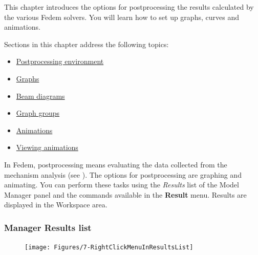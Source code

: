 %
%

%
%


This chapter introduces the options for postprocessing the results calculated by
the various Fedem solvers.
You will learn how to set up graphs, curves and animations.

Sections in this chapter address the following topics:

\begin{itemize}
\item
  \protect\hyperlink{postprocessing-environment}
                    {Postprocessing environment}
\item
  \protect\hyperlink{graphs}
                    {Graphs}
\item
  \protect\hyperlink{beam-diagrams}
                    {Beam diagrams}
\item
  \protect\hyperlink{graph-groups}
                    {Graph groups}
\item
  \protect\hyperlink{animations}
                    {Animations}
\item
  \protect\hyperlink{viewing-animations}
                    {Viewing animations}
\end{itemize}

\clearpage



In Fedem, postprocessing means evaluating the data collected from the mechanism
analysis (see ).
The options for postprocessing are graphing and animating.
You can perform these tasks using the {\sl Results} list of the Model Manager
panel and the commands available in the \textbf{Result} menu.
Results are displayed in the Workspace area.

\medskip
\subsubsection{Manager Results list}

\def\fwidth{0.28\textwidth}
\begin{figure}
  \vspace{-15mm}
  \texttt{[image: Figures/7-RightClickMenuInResultsList]}
\end{figure}

